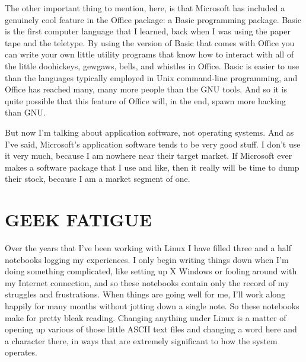 \documentclass[
  fontsize=11pt,
  paper=landscape,
  twocolumn=true,
  pagesize=pdftex,
  headings=small,
  DIV=15,
  ]{scrartcl}
\begin{document}
The other important thing to mention, here, is that Microsoft has
included a genuinely cool feature in the Office package: a Basic
programming package. Basic is the first computer language that I
learned, back when I was using the paper tape and the teletype. By using
the version of Basic that comes with Office you can write your own
little utility programs that know how to interact with all of the little
doohickeys, gewgaws, bells, and whistles in Office. Basic is easier to
use than the languages typically employed in Unix command-line
programming, and Office has reached many, many more people than the GNU
tools. And so it is quite possible that this feature of Office will, in
the end, spawn more hacking than GNU.

But now I'm talking about application software, not operating systems.
And as I've said, Microsoft's application software tends to be very good
stuff. I don't use it very much, because I am nowhere near their target
market. If Microsoft ever makes a software package that I use and like,
then it really will be time to dump their stock, because I am a market
segment of one.

\section{GEEK FATIGUE}

Over the years that I've been working with Linux I have filled three and
a half notebooks logging my experiences. I only begin writing things
down when I'm doing something complicated, like setting up X Windows or
fooling around with my Internet connection, and so these notebooks
contain only the record of my struggles and frustrations. When things
are going well for me, I'll work along happily for many months without
jotting down a single note. So these notebooks make for pretty bleak
reading. Changing anything under Linux is a matter of opening up various
of those little ASCII text files and changing a word here and a
character there, in ways that are extremely significant to how the
system operates.
\end{document}

